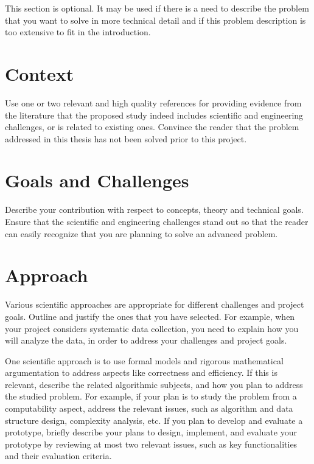 \documentclass{article}
\begin{document}
This section is optional. It may be used if there is a need to describe the
problem that you want to solve in more technical detail and if this problem
description is too extensive to fit in the introduction.

\section{Context}

Use one or two relevant and high quality references for providing evidence from
the literature that the proposed study indeed includes scientific and
engineering challenges, or is related to existing ones. Convince the reader
that the problem addressed in this thesis has not been solved prior to this
project.

\cite{Firsov, Jourdan}

\section{Goals and Challenges}

Describe your contribution with respect to concepts, theory and technical
goals. Ensure that the scientific and engineering challenges stand out so that
the reader can easily recognize that you are planning to solve an advanced
problem. 

\section{Approach}

Various scientific approaches are appropriate for different challenges and
project goals. Outline and justify the ones that you have selected. For
example, when your project considers systematic data collection, you need to
explain how you will analyze the data, in order to address your challenges and
project goals.

One scientific approach is to use formal models and rigorous mathematical
argumentation to address aspects like correctness and efficiency. If this is
relevant, describe the related algorithmic subjects, and how you plan to
address the studied problem. For example, if your plan is to study the problem
from a computability aspect, address the relevant issues, such as algorithm and
data structure design, complexity analysis, etc.  If you plan to develop and
evaluate a prototype, briefly describe your plans to design, implement, and
evaluate your prototype by reviewing at most two relevant issues, such as key
functionalities and their evaluation criteria.
\end{document}
